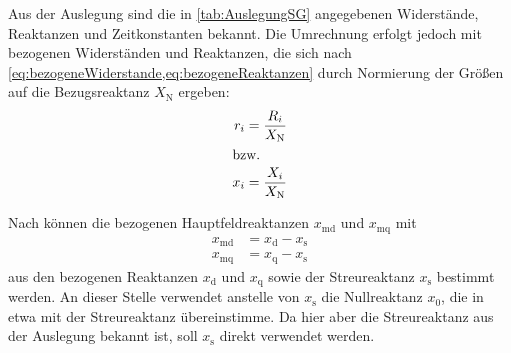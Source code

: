 Aus der Auslegung sind die in \cref{tab:AuslegungSG} angegebenen Widerstände, Reaktanzen und Zeitkonstanten bekannt. Die Umrechnung erfolgt jedoch mit bezogenen Widerständen und Reaktanzen, die sich nach \cref{eq:bezogeneWiderstande,eq:bezogeneReaktanzen} durch Normierung der Größen auf die Bezugsreaktanz $X_{\mathrm{N}}$ ergeben:
\begin{align}
	r_i &= \frac{R_{i}}{X_{\mathrm{N}}} \label{eq:bezogeneWiderstande} \\
	\intertext{bzw.}
	x_i &= \frac{X_{i}}{X_{\mathrm{N}}} \label{eq:bezogeneReaktanzen}
\end{align}

Nach \cite[S. 264]{kralModelicaObjektorientierteModellbildung2019} können die bezogenen Hauptfeldreaktanzen \(x_{\mathrm{md}}\) und \(x_{\mathrm{mq}}\) mit
\begin{align}
    x_{\mathrm{md}} &= x_{\mathrm{d}} - x_{\mathrm{s}} \\
    x_{\mathrm{mq}} &= x_{\mathrm{q}} - x_{\mathrm{s}}
\end{align}
aus den bezogenen Reaktanzen \(x_{\mathrm{d}}\) und \(x_{\mathrm{q}}\) sowie der Streureaktanz \(x_{\mathrm{s}}\) bestimmt werden. An dieser Stelle verwendet \cite[]{kralModelicaObjektorientierteModellbildung2019} anstelle von \(x_{\mathrm{s}}\) die Nullreaktanz \(x_{\mathrm{0}}\), die in etwa mit der Streureaktanz übereinstimme. Da hier aber die Streureaktanz aus der Auslegung bekannt ist, soll \(x_{\mathrm{s}}\) direkt verwendet werden. 

